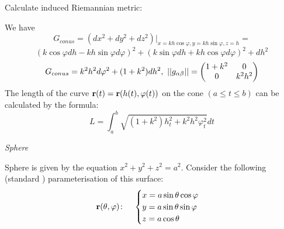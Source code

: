 \documentclass[12pt]{article}
\theoremstyle{theorem}
\numberwithin{equation}{section}
\begin{document}
\medskip

   Calculate induced Riemannian metric:

We have               $$
             G_{conus}=\left(dx^2+dy^2+dz^2\right)\big\vert_{x=kh\cos\varphi,y=kh\sin\varphi,z=h}=
                      $$
                      $$
                      (k\cos\varphi dh-kh\sin\varphi d\varphi)^2+
             (k\sin\varphi dh+kh\cos\varphi d\varphi)^2+dh^2
                      $$
        \begin{equation}\label{firtsquadraticformforconus(diff)}
            G_{conus} =k^2h^2d\varphi^2+(1+k^2)dh^2,\,\,
                        ||g_{\alpha\beta}||=
   \begin{pmatrix}
   1+k^2 & 0 \\
   0&  k^2h^2 \\
   \end{pmatrix}
                       \end{equation}
The length of the curve ${\bf r}(t)={\bf r} (h(t), \varphi(t))$ on the
  cone
    $(a\leq t\leq b)$
  can be calculated by the formula:
               \begin{equation}
             L=\int_a^b
             \sqrt{(1+k^2)h_t^2+k^2h^2\varphi_t^2}dt
               \end{equation}

\medskip

 \centerline {\it Sphere}


\medskip


  Sphere is given by the equation $x^2+y^2+z^2=a^2$. Consider the following
(standard ) parameterisation
 of this surface:
\begin{equation}\label{surfacesphere}
  {\bf r}(\theta,\varphi)\colon\quad
  \begin{cases}
  x=a\sin\theta\cos\varphi\\
  y=a\sin\theta\sin\varphi\\
  z=a\cos\theta\\
  \end{cases}
\end{equation}

\medskip
\end{document}
